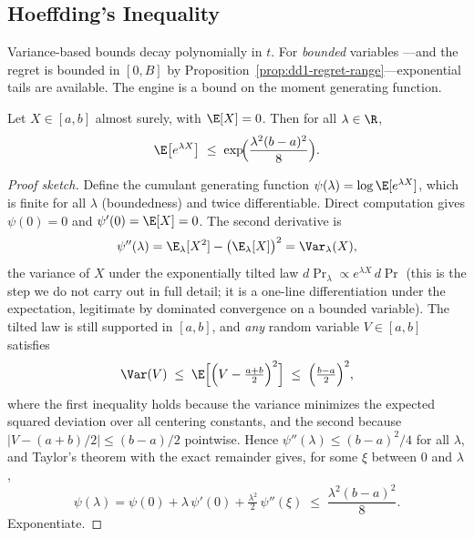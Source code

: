 \subsection{Hoeffding's Inequality}

Variance-based bounds decay polynomially in $t$. For \emph{bounded} variables
---and the regret is bounded in $[0, B]$ by
Proposition~\ref{prop:dd1-regret-range}---exponential tails are available.
The engine is a bound on the moment generating function.

\begin{lemma}
\label{lem:dd1-hoeffding-lemma}
Let $X \in [a, b]$ almost surely, with $\E[X] = 0$. Then for all
$\lambda \in \R$,
\begin{equation}
\label{eq:dd1-hoeffding-lemma}
\E\bigl[ e^{\lambda X} \bigr] \;\le\;
\exp\!\Bigl( \frac{\lambda^2 (b - a)^2}{8} \Bigr).
\end{equation}
\end{lemma}

\begin{proof}[Proof sketch]
Define the cumulant generating function $\psi(\lambda) = \log \E[e^{\lambda
X}]$, which is finite for all $\lambda$ (boundedness) and twice
differentiable. Direct computation gives $\psi(0) = 0$ and
$\psi'(0) = \E[X] = 0$. The second derivative is
\[
\psi''(\lambda) = \E_\lambda[X^2] - \bigl(\E_\lambda[X]\bigr)^2
= \Var_\lambda(X),
\]
the variance of $X$ under the exponentially tilted law
$d\Pr_\lambda \propto e^{\lambda X}\, d\Pr$ (this is the step we do not carry
out in full detail; it is a one-line differentiation under the expectation,
legitimate by dominated convergence on a bounded variable). The tilted law is
still supported in $[a, b]$, and \emph{any} random variable $V \in [a, b]$
satisfies
\[
\Var(V) \;\le\; \E\Bigl[\Bigl(V - \tfrac{a + b}{2}\Bigr)^2\Bigr]
\;\le\; \Bigl(\tfrac{b - a}{2}\Bigr)^2,
\]
where the first inequality holds because the variance minimizes the expected
squared deviation over all centering constants, and the second because
$|V - (a+b)/2| \le (b-a)/2$ pointwise. Hence
$\psi''(\lambda) \le (b - a)^2 / 4$ for all $\lambda$, and Taylor's theorem
with the exact remainder gives, for some $\xi$ between $0$ and $\lambda$,
\[
\psi(\lambda) = \psi(0) + \lambda\,\psi'(0)
+ \tfrac{\lambda^2}{2}\,\psi''(\xi)
\;\le\; \frac{\lambda^2 (b-a)^2}{8}.
\]
Exponentiate.
\end{proof}

